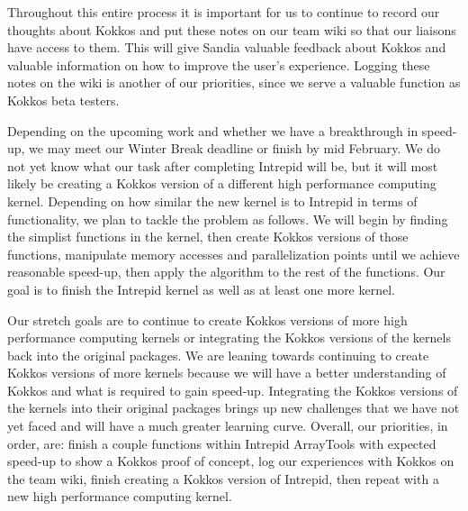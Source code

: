 \documentclass{hmcclinic}
\begin{document}
Throughout this entire process it is important for  us to continue to record our
thoughts about Kokkos and put these notes on our team wiki so that our liaisons
have access to them.  This will give Sandia valuable feedback about Kokkos and
valuable information on how to improve the user's experience. Logging these
notes on the wiki is another of our priorities, since we serve a valuable
function as Kokkos beta testers. 

Depending on the upcoming work and whether we have a breakthrough in speed-up,
we may meet our Winter Break deadline or finish by mid February. We do not yet
know what our task after completing Intrepid will be, but it will most likely be
creating a Kokkos version of a different high performance computing kernel.
Depending on how similar the new kernel is to Intrepid in terms of
functionality, we plan to tackle the problem as follows. We will begin by
finding the simplist functions in the kernel, then create Kokkos versions of
those functions, manipulate memory accesses and parallelization points until we
achieve reasonable speed-up, then apply the algorithm to the rest of the
functions. Our goal is to finish the Intrepid kernel as well as at least one
more kernel. 

Our stretch goals are to continue to create Kokkos versions of more high
performance computing kernels or integrating the Kokkos versions of the kernels
back into the original packages. We are leaning towards continuing to create
Kokkos versions of more kernels because we will have a better understanding of
Kokkos and what is required to gain speed-up.  Integrating the Kokkos versions
of the kernels into their original packages brings up new challenges that we
have not yet faced and will have a much greater learning curve. Overall, our
priorities, in order, are: finish a couple functions within Intrepid ArrayTools
with expected speed-up to show a Kokkos proof of concept, log our experiences
with Kokkos on the team wiki, finish creating a Kokkos version of Intrepid, then
repeat with a new high performance computing kernel.
\end{document}
